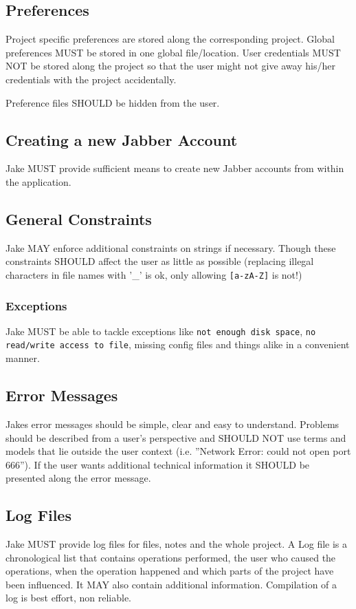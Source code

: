 \subsection{Preferences}
Project specific preferences are stored along the corresponding project. Global preferences MUST be stored in one global file/location. User credentials MUST NOT be stored along the project so that the user might not give away his/her credentials with the project accidentally.

Preference files SHOULD be hidden from the user.

\subsection{Creating a new Jabber Account}
Jake MUST provide sufficient means to create new Jabber accounts from within the application.

\subsection{General Constraints}
Jake MAY enforce additional constraints on strings if necessary. Though these constraints SHOULD affect the user as little as possible (replacing illegal characters in file names with '\_' is ok, only allowing \texttt{[a-zA-Z]} is not!)

\subsubsection{Exceptions}
Jake  MUST be able to tackle exceptions like \texttt{not enough disk space}, \texttt{no read/write access to file}, missing config files and things alike in a convenient manner.

\subsection{Error Messages}
Jakes error messages should be simple, clear and easy to understand. Problems should be described from a user's perspective and SHOULD NOT use terms and models that lie outside the user context (i.e. ''Network Error: could not open port 666''). If the user wants additional technical information it SHOULD be presented along the error message.

\subsection{Log Files}
Jake MUST provide log files for files, notes and the whole project. A Log file is a chronological list that contains operations performed, the user who caused the operations, when the operation happened and which parts of the project have been influenced. It MAY also contain additional information. Compilation of a log is best effort, non reliable.


